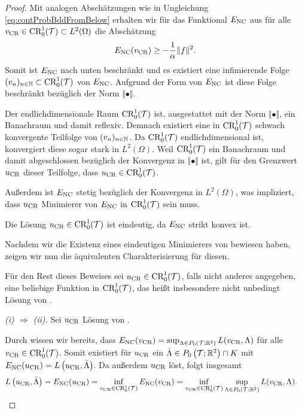 \begin{proof} 
  Mit analogen Abschätzungen wie in Ungleichung \eqref{eq:contProbBddFromBelow}
  erhalten wir für das Funktional $E_\textup{NC}$ aus  
  für alle $v_\textup{CR}\in\textup{CR}^1_0(\mathcal{T})\subset L^2(\Omega)$ die Abschätzung 
  \begin{equation*}
    E_\textup{NC}(v_\textup{CR}) \geq -\frac{1}{\alpha}\Vert f\Vert^2.
  \end{equation*}
  Somit ist $E_\textup{NC}$ nach unten beschränkt und es existiert eine infimierende
  Folge $(v_n)_{n\in\mathbb{N}} \subset \textup{CR}^1_0(\mathcal{T})$ von $E_\textup{NC}$. 
  Aufgrund der Form von $E_\textup{NC}$ ist diese Folge beschränkt bezüglich der Norm
  $\Vert\bullet\Vert$. 

  Der endlichdimensionale Raum $\textup{CR}^1_0(\mathcal{T})$ ist, ausgestattet mit der Norm
  $\Vert\bullet\Vert$, ein Banachraum und damit reflexiv. 
  Demnach existiert eine in $\textup{CR}^1_0(\mathcal{T})$ schwach konvergente Teilfolge von
  $(v_n)_{n\in\mathbb{N}}$.
  Da $\textup{CR}^1_0(\mathcal{T})$ endlichdimensional ist, konvergiert diese sogar stark
  in $L^2(\Omega)$. 
  Weil $\textup{CR}^1_0(\mathcal{T})$ ein Banachraum und damit abgeschlossen bezüglich der
  Konvergenz in $\Vert\bullet\Vert$ ist, gilt für den Grenzwert $u_\textup{CR}$ dieser
  Teilfolge, dass $u_\textup{CR}\in\textup{CR}^1_0(\mathcal{T})$.

  Außerdem ist $E_\textup{NC}$ stetig bezüglich der Konvergenz in $L^2(\Omega)$,
  was impliziert, dass $u_\textup{CR}$ Minimierer von $E_\textup{NC}$ in $\textup{CR}^1_0(\mathcal{T})$ sein
  muss. 

  Die Lösung $u_\textup{CR}\in \textup{CR}^1_0(\mathcal{T})$ ist eindeutig, da $E_\textup{NC}$ strikt konvex
  ist.

  Nachdem wir die Existenz eines eindeutigen Minimierers von
   bewiesen haben, zeigen wir nun die äquivalenten
  Charakterisierung für diesen.

  Für den Rest dieses Beweises sei $u_\textup{CR}\in\textup{CR}^1_0(\mathcal{T})$, falls
  nicht anderes angegeben, eine beliebige Funktion in $\textup{CR}^1_0(\mathcal{T})$, das
  heißt insbesondere nicht unbedingt Lösung von .

  \textit{(i) $\Rightarrow$ (ii).}
  Sei $u_\textup{CR}$ Lösung von .

  Durch  wissen wir bereits,
  dass $E_\textup{NC}(v_\textup{CR}) = \sup_{\Lambda\in
  P_0\left(\mathcal{T};\mathbb{R}^2\right)}L(v_\textup{CR},\Lambda)$ für alle
  $v_\textup{CR}\in\textup{CR}^1_0(\mathcal{T})$.
  Somit existiert für $u_\textup{CR}$ ein $\bar\Lambda\in
  P_0\left(\mathcal{T};\mathbb{R}^2\right)\cap K$ mit $E_\textup{NC}(u_\textup{CR}) =
  L\left(u_\textup{CR},\bar\Lambda\right)$. 
  Da außerdem $u_\textup{CR}$  löst, folgt insgesamt
  \begin{align}
    \label{eq:lagrangianEqualsInfSup}
    L\left(u_\textup{CR},\bar\Lambda\right)
    &=
    E_\textup{NC}(u_\textup{CR})
    =
    \inf_{v_\textup{CR}\in\textup{CR}^1_0(\mathcal{T})}E_\textup{NC}(v_\textup{CR})
    =
    \inf_{v_\textup{CR}\in\textup{CR}^1_0(\mathcal{T})}\sup_{\Lambda\in P_0\left(\mathcal{T};\mathbb{R}^2\right)} 
    L(v_\textup{CR},\Lambda).
  \end{align}


\end{proof}
